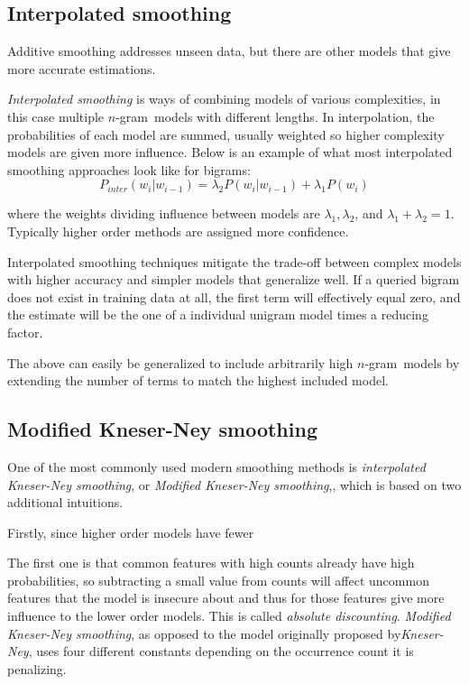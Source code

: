 \documentclass[a4paper,11pt]{kth-mag}
\newcommand{\ngram}{$n$-gram}
\begin{document}
\subsection{Interpolated smoothing}
Additive smoothing addresses unseen data, but there are other models that give more accurate estimations.

\emph{Interpolated smoothing} is ways of combining models of various complexities, in this case multiple \ngram~models with different lengths. In interpolation, the probabilities of each model are summed, usually weighted so higher complexity models are given more influence\cite{chen_goodman}.
Below is an example of what most interpolated smoothing approaches look like for bigrams:
\begin{equation}\label{eq:interpolated_smoothing}
  P_{inter}(w_i|w_{i-1}) =
  \lambda_2 P(w_i|w_{i-1}) + \lambda_1 P(w_i)
\end{equation}

where the weights dividing influence between models are $\lambda_1, \lambda_2$, and $\lambda_1 + \lambda_2 = 1$. Typically higher order methods are assigned more confidence.

Interpolated smoothing techniques mitigate the trade-off between complex models with higher accuracy and simpler models that generalize well. If a queried bigram does not exist in training data at all, the first term will effectively equal zero, and the estimate will be the one of a individual unigram model times a reducing factor.

The above can easily be generalized to include arbitrarily high \ngram~models by extending the number of terms to match the highest included model.

\subsection{Modified Kneser-Ney smoothing}
One of the most commonly used modern smoothing methods is \emph{interpolated Kneser-Ney smoothing}, or \emph{Modified Kneser-Ney smoothing},\cite{nlp_book}, which is based on two additional intuitions.

Firstly, since higher order models have fewer

The first one is that common features with high counts already have high probabilities, so subtracting a small value from counts will affect uncommon features that the model is insecure about and thus for those features give more influence to the lower order models. This is called \emph{absolute discounting}\cite{npl_book}. \emph{Modified Kneser-Ney smoothing}, as opposed to the model originally proposed by\emph{Kneser-Ney}, uses four different constants depending on the occurrence count it is penalizing.
\end{document}
